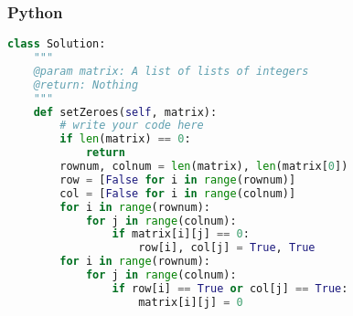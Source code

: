 \subsubsection{Python}
\begin{lstlisting}[language=Python]
class Solution:
    """
    @param matrix: A list of lists of integers
    @return: Nothing
    """
    def setZeroes(self, matrix):
        # write your code here
        if len(matrix) == 0:
            return
        rownum, colnum = len(matrix), len(matrix[0])
        row = [False for i in range(rownum)]
        col = [False for i in range(colnum)]
        for i in range(rownum):
            for j in range(colnum):
                if matrix[i][j] == 0:
                    row[i], col[j] = True, True
        for i in range(rownum):
            for j in range(colnum):
                if row[i] == True or col[j] == True:
                    matrix[i][j] = 0
\end{lstlisting}
\normalsize 